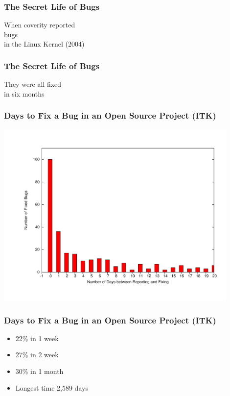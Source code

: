 \documentclass[18pt]{beamer}
\begin{document}
\begin{frame}
\frametitle{The Secret Life of Bugs}
\Huge
When coverity reported\\
 bugs\\
\pause
in the Linux Kernel (2004)\\
\end{frame}


\begin{frame}
\frametitle{The Secret Life of Bugs}
\Huge
They were all fixed\\
\pause
in six months\\
\end{frame}


\begin{frame}
\frametitle{Days to Fix a Bug in an Open Source Project (ITK)}
\includegraphics[width=0.9\textwidth,height=0.9\paperheight]{../Art/ITKBugFixesScheduleHistogramPlot.pdf}
\end{frame}


\begin{frame}
\frametitle{Days to Fix a Bug in an Open Source Project (ITK)}
\Huge
\begin{itemize}
\item 22\% in 1 week
\pause
\item 27\% in 2 week
\pause
\item 30\% in 1 month
\pause
\item Longest time 2,589 days
\end{itemize}
\end{frame}
\end{document}
